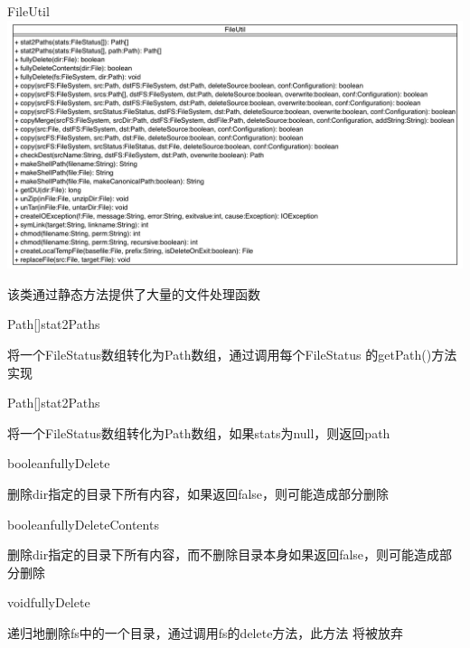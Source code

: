 \begin{XeClass}{FileUtil}
\includegraphics[width=\textwidth]{cdig/FileUtil.png}
     
 该类通过静态方法提供了大量的文件处理函数

    \begin{XeMethod}{\XePublic}{Path[]}{stat2Paths}
         
 将一个FileStatus数组转化为Path数组，通过调用每个FileStatus
 的getPath()方法实现

    \end{XeMethod}

    \begin{XeMethod}{\XePublic}{Path[]}{stat2Paths}
         
 将一个FileStatus数组转化为Path数组，如果stats为null，则返回path

    \end{XeMethod}

    \begin{XeMethod}{\XePublic}{boolean}{fullyDelete}
         
 删除dir指定的目录下所有内容，如果返回false，则可能造成部分删除

    \end{XeMethod}

    \begin{XeMethod}{\XePublic}{boolean}{fullyDeleteContents}
         
 删除dir指定的目录下所有内容，而不删除目录本身如果返回false，则可能造成部分删除

    \end{XeMethod}

    \begin{XeMethod}{\XePublic}{void}{fullyDelete}
         
 递归地删除fs中的一个目录，通过调用fs的delete方法，此方法
 将被放弃


\end{XeMethod}
\end{XeClass}

